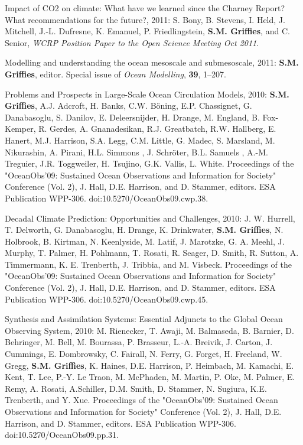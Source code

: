 \begin{etaremune}
\item Impact of CO2 on climate: What have we learned since the Charney
  Report?  What recommendations for the future?, 2011: S. Bony,
  B. Stevens, I. Held, J. Mitchell, J.-L. Dufresne, K. Emanuel,
  P. Friedlingstein, {\bf S.M. Grif\/f\/ies}, and C. Senior, {\it WCRP
    Position Paper to the Open Science Meeting Oct 2011}.

\item Modelling and understanding the ocean mesoscale and
  submesoscale, 2011: {\bf S.M. Griffies}, editor. Special issue of
  {\it Ocean Modelling}, {\bf 39}, 1--207.

\item Problems and Prospects in Large-Scale Ocean Circulation Models,
  2010: {\bf S.M. Griffies}, A.J. Adcroft, H. Banks, C.W. B\"oning,
 E.P. Chassignet, G. Danabasoglu, S.  Danilov, E. Deleersnijder,
  H. Drange, M. England, B. Fox-Kemper, R. Gerdes, A.  Gnanadesikan,
  R.J. Greatbatch, R.W. Hallberg, E. Hanert, M.J. Harrison, S.A. Legg,
  C.M.  Little, G. Madec, S. Marsland, M. Nikurashin, A. Pirani,
  H.L. Simmons , J. Schr\"oter, B.L.  Samuels , A.-M. Treguier,
  J.R. Toggweiler, H. Tsujino, G.K. Vallis, L. White.  Proceedings of
  the "OceanObs’09: Sustained Ocean Observations and Information for
  Society" Conference (Vol. 2), J. Hall, D.E. Harrison, and
  D. Stammer, editors. ESA Publication WPP-306.
  doi:10.5270/OceanObs09.cwp.38.

\item Decadal Climate Prediction: Opportunities and Challenges, 2010:
  J. W. Hurrell, T. Delworth, G. Danabasoglu, H. Drange,
  K. Drinkwater, {\bf S.M. Griffies}, N. Holbrook, B. Kirtman,
  N. Keenlyside, M. Latif, J. Marotzke, G. A. Meehl, J. Murphy,
  T. Palmer, H. Pohlmann, T. Rosati, R. Seager, D. Smith, R. Sutton,
  A. Timmermann, K. E. Trenberth, J. Tribbia, and M. Visbeck.
  Proceedings of the "OceanObs’09: Sustained Ocean Observations and
  Information for Society" Conference (Vol. 2), J. Hall,
  D.E. Harrison, and D. Stammer, editors. ESA Publication WPP-306.
  doi:10.5270/OceanObs09.cwp.45.

\item Synthesis and Assimilation Systems: Essential Adjuncts to the
  Global Ocean Observing System, 2010: M. Rienecker, T. Awaji,
  M. Balmaseda, B. Barnier, D. Behringer, M. Bell, M. Bourassa,
  P. Brasseur, L.-A. Breivik, J. Carton, J. Cummings, E. Dombrowsky,
  C. Fairall, N. Ferry, G. Forget, H. Freeland, W. Gregg, {\bf
    S.M. Grif\/f\/ies}, K. Haines, D.E. Harrison, P. Heimbach,
  M. Kamachi, E. Kent, T. Lee, P.-Y. {Le Traon}, M. McPhaden,
  M. Martin, P. Oke, M. Palmer, E. Remy, A. Rosati, A.Schiller,
  D.M. Smith, D. Stammer, N. Sugiura, K.E. Trenberth, and Y. Xue.
  Proceedings of the "OceanObs’09: Sustained Ocean Observations and
  Information for Society" Conference (Vol. 2), J. Hall,
  D.E. Harrison, and D. Stammer, editors. ESA Publication WPP-306.
  doi:10.5270/OceanObs09.pp.31.


\end{etaremune}
